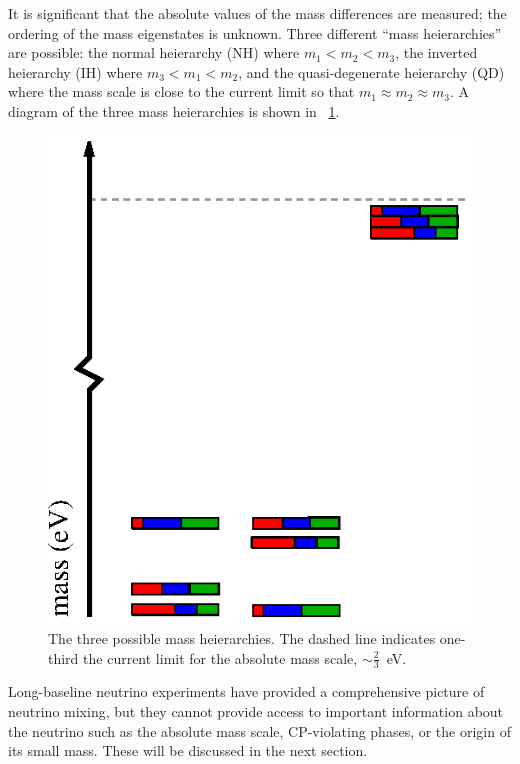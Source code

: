 It is significant that the absolute values of the mass differences are measured; the ordering of the mass eigenstates is unknown.  Three different ``mass heierarchies'' are possible: the normal heierarchy (NH) where $m_1 < m_2 < m_3$, the inverted heierarchy (IH) where $m_3 < m_1 < m_2$, and the quasi-degenerate heierarchy (QD) where the mass scale is close to the current limit so that $m_1 \approx m_2 \approx m_3$.  A diagram of the three mass heierarchies is shown in {\fig}~\ref{fig:massScale}.
\begin{figure}[htp]
\centering
\includegraphics[height=0.8\textwidth,angle=-90]{figures/mass_scale.eps}
\caption[Neutrino mass heierarchies.]{The three possible mass heierarchies.  The dashed line indicates one-third the current limit for the absolute mass scale, $\sim\frac{2}{3}$~eV.}
\label{fig:massScale}
\end{figure}  

Long-baseline neutrino experiments have provided a comprehensive picture of neutrino mixing, but they cannot provide access to important information about the neutrino such as the absolute mass scale, CP-violating phases, or the origin of its small mass.  These will be discussed in the next section.


